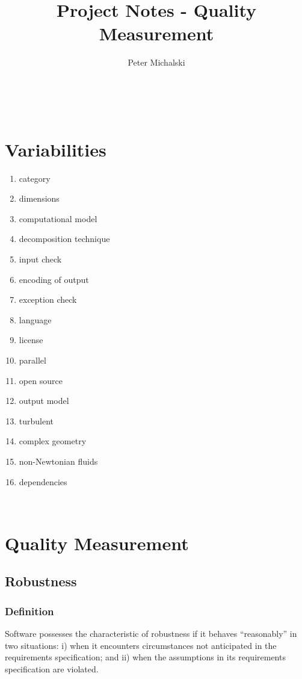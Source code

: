 \documentclass{article}
\title{Project Notes - Quality Measurement}
\author{Peter Michalski}
\date{}
\begin{document}
\maketitle


\newpage

\tableofcontents
{}

~\newpage
\section{Variabilities}

\begin{enumerate}
	\item category
	\item dimensions
	\item computational model
	\item decomposition technique
	\item input check
	\item encoding of output
	\item exception check
	\item language
	\item license
	\item parallel
	\item open source
	\item output model
	\item turbulent
	\item complex geometry
	\item non-Newtonian fluids
	\item dependencies
\end{enumerate}

~\newpage
\section{Quality Measurement}
\subsection{Robustness}
\subsubsection{Definition}
Software possesses the characteristic of robustness if it behaves ``reasonably'' in two situations: i) when it encounters circumstances not anticipated in the requirements specification; and ii) when the assumptions in its requirements specification are violated.
\end{document}
